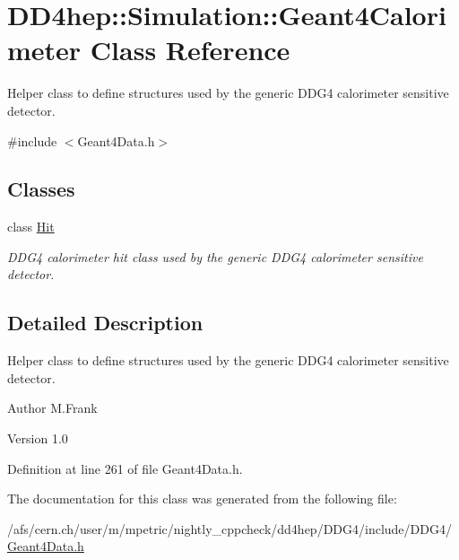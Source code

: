 \hypertarget{class_d_d4hep_1_1_simulation_1_1_geant4_calorimeter}{
\section{DD4hep::Simulation::Geant4Calorimeter Class Reference}
\label{class_d_d4hep_1_1_simulation_1_1_geant4_calorimeter}
}


Helper class to define structures used by the generic DDG4 calorimeter sensitive detector.  


{\ttfamily \#include $<$Geant4Data.h$>$}\subsection*{Classes}
\begin{DoxyCompactItemize}
\item 
class \hyperlink{class_d_d4hep_1_1_simulation_1_1_geant4_calorimeter_1_1_hit}{Hit}
\begin{DoxyCompactList}\small\item\em DDG4 calorimeter hit class used by the generic DDG4 calorimeter sensitive detector. \item\end{DoxyCompactList}\end{DoxyCompactItemize}


\subsection{Detailed Description}
Helper class to define structures used by the generic DDG4 calorimeter sensitive detector. \begin{DoxyAuthor}{Author}
M.Frank 
\end{DoxyAuthor}
\begin{DoxyVersion}{Version}
1.0 
\end{DoxyVersion}


Definition at line 261 of file Geant4Data.h.

The documentation for this class was generated from the following file:\begin{DoxyCompactItemize}
\item 
/afs/cern.ch/user/m/mpetric/nightly\_\-cppcheck/dd4hep/DDG4/include/DDG4/\hyperlink{_geant4_data_8h}{Geant4Data.h}\end{DoxyCompactItemize}
